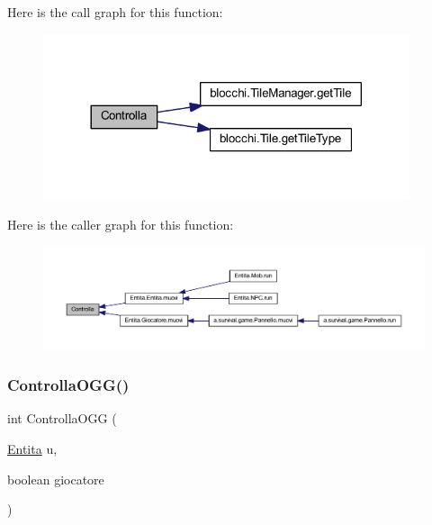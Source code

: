 Here is the call graph for this function\+:
\nopagebreak
\begin{figure}[H]
\begin{center}
\leavevmode
\includegraphics[width=305pt]{classa_1_1survival_1_1game_1_1_collisioni_a839c38fa5d30f0458af3dcf4bf04f358_cgraph}
\end{center}
\end{figure}
Here is the caller graph for this function\+:
\nopagebreak
\begin{figure}[H]
\begin{center}
\leavevmode
\includegraphics[width=350pt]{classa_1_1survival_1_1game_1_1_collisioni_a839c38fa5d30f0458af3dcf4bf04f358_icgraph}
\end{center}
\end{figure}
\mbox{\label{classa_1_1survival_1_1game_1_1_collisioni_ad38c8b3c50bbbd655ef3f9e2c80b21e0}} 
\subsubsection{\texorpdfstring{Controlla\+O\+G\+G()}{ControllaOGG()}}
{\footnotesize\ttfamily int Controlla\+O\+GG (\begin{DoxyParamCaption}\item[{\hyperlink{class_entita_1_1_entita}{Entita}}]{u,  }\item[{boolean}]{giocatore }\end{DoxyParamCaption})}



